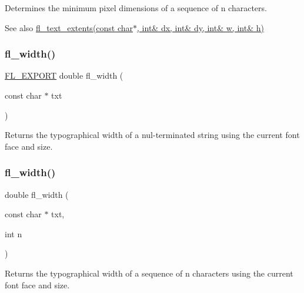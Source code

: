 Determines the minimum pixel dimensions of a sequence of {\ttfamily n} characters. \begin{DoxySeeAlso}{See also}
\hyperlink{group__fl__attributes_ga14cb75a92b6cdd576f9512b38a208f8b}{fl\+\_\+text\+\_\+extents(const char$\ast$, int\& dx, int\& dy, int\& w, int\& h)} 
\end{DoxySeeAlso}
\mbox{\label{group__fl__attributes_ga92c762ce2fc7fa891bac6b7590f967bd}} 
\subsubsection{\texorpdfstring{fl\+\_\+width()}{fl\_width()}\hspace{0.1cm}{\footnotesize\ttfamily [1/3]}}
{\footnotesize\ttfamily \hyperlink{_fl___export_8_h_aa9ba29a18aee9d738370a06eeb4470fc}{F\+L\+\_\+\+E\+X\+P\+O\+RT} double fl\+\_\+width (\begin{DoxyParamCaption}\item[{const char $\ast$}]{txt }\end{DoxyParamCaption})}

Returns the typographical width of a nul-\/terminated string using the current font face and size. \mbox{\label{group__fl__attributes_gae491dc82c611608435ed434e368ef668}} 
\subsubsection{\texorpdfstring{fl\+\_\+width()}{fl\_width()}\hspace{0.1cm}{\footnotesize\ttfamily [2/3]}}
{\footnotesize\ttfamily double fl\+\_\+width (\begin{DoxyParamCaption}\item[{const char $\ast$}]{txt,  }\item[{int}]{n }\end{DoxyParamCaption})\hspace{0.3cm}{\ttfamily [inline]}}

Returns the typographical width of a sequence of {\ttfamily n} characters using the current font face and size. \mbox{\label{group__fl__attributes_ga4a5b5e4a977299acdc7fcbd3c8a700b5}} 
